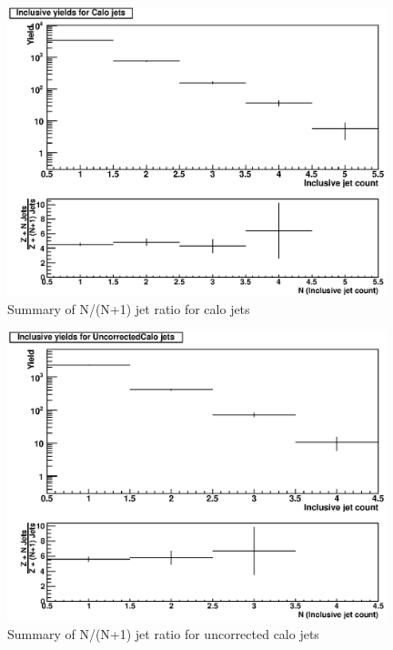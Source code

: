 \documentclass{cmspaper}
\begin{document}
\begin{figure}[hbtp]
   \begin{center} 
  \includegraphics[width=110mm]{FinalPlot_FloatAll_Calo}
   \caption{Summary of N/(N+1) jet ratio for calo jets}
   \label{Figure_RatioFromDataCaloJet}
   \end{center}
\end{figure}

\begin{figure}[hbtp]
   \begin{center}
   \includegraphics[width=110mm]{FinalPlot_FloatAll_UncorrectedCalo}
   \caption{Summary of N/(N+1) jet ratio for uncorrected calo jets}
   \label{Figure_RatioFromDataUncorrectedCaloJet}
   \end{center}
\end{figure}
\end{document}
